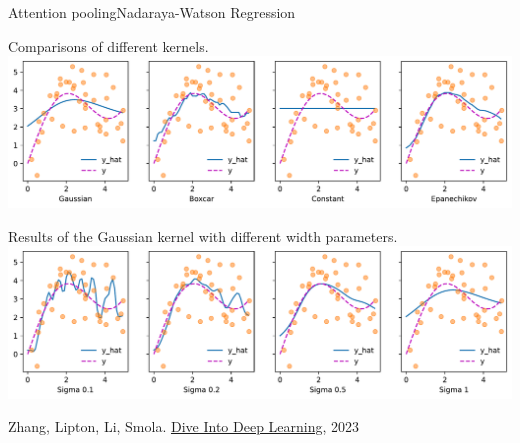 \documentclass{beamer}
\begin{document}
\begin{frame}{Attention pooling}{Nadaraya-Watson Regression}
\vspace{-1cm}
 \begin{center}
 Comparisons of different kernels.
        \includegraphics[scale=0.3]{Module 6 (Attention-based networks)/pics/output_attention-pooling_d5e6b2_67_0.pdf}
    \end{center}

    \begin{center}
    Results of the Gaussian kernel with different width parameters. 
        \includegraphics[scale=0.3]{Module 6 (Attention-based networks)/pics/output_attention-pooling_d5e6b2_97_0.pdf}
    \end{center}
\footnotesize{Zhang, Lipton, Li, Smola. 
\href{http://d2l.ai/chapter_attention-mechanisms-and-transformers/attention-pooling.html}{{\color{blue}Dive Into Deep Learning}}, 2023}
\end{frame}
\end{document}
